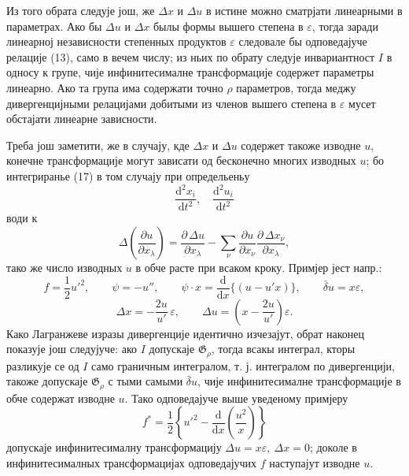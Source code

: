 ﻿\documentclass[11pt]{article}
\providecommand{\G}{\mathfrak G}
\providecommand{\eps}{\varepsilon}
\providecommand{\D}{\Delta}
\providecommand{\p}{\partial}
\providecommand{\dd}{\mathrm d}
\providecommand{\bd}{\bar{\delta}}
\begin{document}
Из того обрата следује још, же \(\D x\) и \(\D u\) в истине можно сматрјати линеарными в параметрах. Ако бы \(\D u\) и \(\D x\) былы формы вышего степена в \(\eps\), тогда заради линеарној независности степенных продуктов \(\eps\) следовале бы одповедајуче релације (13), само в вечем числу; из ньих по обрату следује инвариантност \(I\) в односу к групе, чије инфинитесималне трансформације содержет параметры линеарно. Ако та група има содержати точно \(\rho\) параметров, тогда меджу дивергенцијными релацијами добитыми из членов вышего степена в \(\eps\) мусет обстајати линеарне зависности.

Треба још заметити, же в случају, кде \(\D x\) и \(\D u\) содержет такоже изводне \(u\), конечне трансформације могут зависати од бесконечно многих изводных \(u\); бо интегриранье (17) в том случају при определьеньу
\[
\frac{\dd^2x_i}{\dd t^2},\quad \frac{\dd^2u_i}{\dd t^2}
\]
води к
\[
\D\!\left(\frac{\p u}{\p x_\lambda}\right)
=\frac{\p\,\D u}{\p x_\lambda}
-\sum_\nu\frac{\p u}{\p x_\nu}
\frac{\p\,\D x_\nu}{\p x_\lambda},
\]
тако же число изводных \(u\) в обче расте при всаком кроку. Примјер јест напр.:
\[
f=\frac12 u'^2,\qquad
\psi=-u'',\qquad
\psi\cdot x=\frac{\dd}{\dd x}\{(u-u'x)\},\qquad
\bd u=x\eps,
\]
\[
\D x=-\frac{2u}{u'}\,\eps,\qquad
\D u=\left(x-\frac{2u}{u'}\right)\eps.
\]
Како Лагранжеве изразы дивергенције идентично изчезајут, обрат наконец показује још следујуче: ако \(I\) допускаје \(\G_\rho\), тогда всакы интеграл, кторы разликује се од \(I\) само граничным интегралом, т. ј. интегралом по дивергенцији, такоже допускаје \(\G_\rho\) с тыми самыми \(\bd u\), чије инфинитесималне трансформације в обче содержат изводне \(u\). Тако одповедајуче выше уведеному примјеру
\[
f^*=\frac12\left\{u'^2-\frac{\dd}{\dd x}\left(\frac{u^2}{x}\right)\right\}
\]
допускаје инфинитесималну трансформацију \(\D u=x\eps,\ \D x=0\); доколе в инфинитесималных трансформацијах одповедајучих \(f\) наступајут изводне \(u\).
\end{document}
